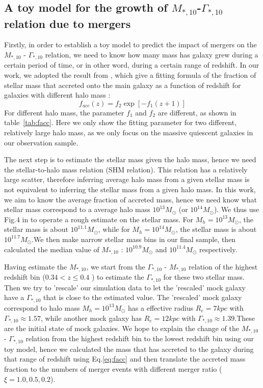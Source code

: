 \documentclass[fleqn,usenatbib]{mnras}
\begin{document}
\subsection{A toy model for the growth of $M_{*,10}$-$\Gamma_{*,10}$ relation due to mergers}
\label{sec:toy}
Firstly, in order to establish a toy model to predict the impact of mergers on the $M_{*,10}$ - $\Gamma_{*,10}$ relation, we need to know how many mass has galaxy grew during a certain period of time, or in other word, during a certain range of redshift. In our work, we adopted the result from \cite{2018moster}, which give a fitting formula of the fraction of stellar mass that accreted onto the main galaxy as a function of redshift for galaxies with different halo mass : 
\begin{equation}
    \label{eq:facc}
    f_{acc}(z) = f_2\exp \left[-f_1(z+1)\right]
\end{equation}
For different halo mass, the parameter $f_1$ and $f_2$ are different, as shown in table~\ref{tab:facc}. Here we only show the fitting parameter for two different, relatively large halo mass, as we only focus on the massive quiescent galaxies in our observation sample.
\par The next step is to estimate the stellar mass given the halo mass, hence we need the stellar-to-halo mass relation (SHM relation). This relation has a relatively large scatter, therefore inferring average halo mass from a given stellar mass is not equivalent to inferring the stellar mass from a given halo mass. In this work, we aim to know the average fraction of accreted mass, hence we need know what stellar mass correspond to a average halo mass $10^{13}M_\odot$ (or $10^{14}M_\odot$).  We thus use Fig.4 in \cite{2020moster} to operate a rough estimate on the stellar mass. For $M_h = 10^{13}M_\odot$, the stellar mass is about $10^{11.1}M_\odot$, while for $M_h = 10^{14}M_\odot$, the stellar mass is about $10^{11.7}M_\odot$.We then make narrow stellar mass bins in our final sample, then calculated the median value of $M_{*,10}$ : $10^{10.9}M_\odot$ and $10^{11.4}M_\odot$ respectively.
\par Having estimate the $M_{*,10}$, we start from the $\Gamma_{*,10}$ - $M_{*,10}$ relation of the highest redshift bin ($0.34 < z \leq 0.4$ ) to estimate the $\Gamma_{*,10}$ for these two stellar mass. Then we try to 'rescale' our simulation data to let the 'rescaled' mock galaxy have a $\Gamma_{*,10}$ that is close to the estimated value.  The 'rescaled' mock galaxy correspond to halo mass $M_h = 10^{13}M_\odot$ has a effective radius $R_e = 7 kpc$ with $\Gamma_{*,10} \approx 1.57$, while another mock galaxy has $R_e = 12kpc$ with $\Gamma_{*,10} \approx 1.39$.These are the initial state of mock galaxies. We hope to explain the change of the $M_{*,10}$ - $\Gamma_{*,10}$ relation from the highest redshift bin to the lowest redshift bin using our toy model, hence we calculated the mass that has accreted to the galaxy during that range of redshift using Eq.\ref{eq:facc} and then translate the accreted mass fraction to the numbers of merger events with different merger ratio ($\xi = 1.0,0.5,0.2$). 
\end{document}

